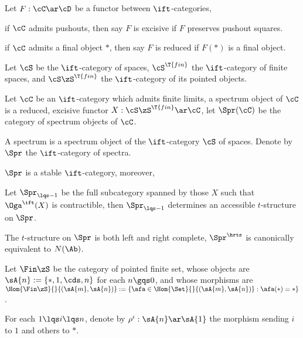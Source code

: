 \documentclass[article, a4paper, twoside]{universal}
\begin{document}
\begin{dfn}[1.4.2.1]
    Let $F:\cC\ar\cD$ be a functor between $\ift$-categories,
    \begin{enr}[label=(\arabic*)]
        \item if $\cC$ admits pushouts, then say $F$ is excisive if $F$ preserves pushout squares.
        \item if $\cC$ admits a final object $*$, then say $F$ is reduced if $F(*)$ is a final object.
    \end{enr}
\end{dfn}


\begin{dfn}[1.4.2.5, 1.4.2.8, 1.4.3.1]
    Let $\cS$ be the $\ift$-category of spaces, $\cS^{\T{fin}}$ the $\ift$-category of finite spaces, and $\cS\zS^{\T{fin}}$ the $\ift$-category of its pointed objects.

    Let $\cC$ be an $\ift$-category which admits finite limits, a spectrum object of $\cC$ is a reduced, excisive functor $X:\cS\zS^{\T{fin}}\ar\cC$, let $\Spr(\cC)$ be the category of spectrum objects of $\cC$.

    A spectrum is a spectrum object of the $\ift$-category $\cS$ of spaces. Denote by $\Spr$ the $\ift$-category of spectra.
\end{dfn}

\begin{thm}[1.4.3.6]
    $\Spr$ is a stable $\ift$-category, moreover,
    \begin{enr}[label=(\arabic*)]
        \item Let $\Spr_{\lqs-1}$ be the full subcategory spanned by those $X$ such that $\Oga^{\ift}(X)$ is contractible, then $\Spr_{\lqs-1}$ determines an accessible $t$-structure on $\Spr$.
        \item The $t$-structure on $\Spr$ is both left and right complete, $\Spr^{\hrts}$ is canonically equivalent to $N(\Ab)$.
    \end{enr}
\end{thm}


\begin{dfn}[2.0.0.2]
    Let $\Fin\zS$ be the category of pointed finite set, whose objects are $\sA{n}:=\{*,1,\cds,n\}$ for each $n\gqs0$, and whose morphisms are $\Hom{\Fin\zS}{}{(\sA{m},\sA{n})}:=\{\afa\in\Hom{\Set}{}{(\sA{m},\sA{n})}:\afa(*)=*\}$.

    For each $1\lqs i\lqs n$, denote by $\rho^{i}:\sA{n}\ar\sA{1}$ the morphism sending $i$ to $1$ and others to $*$.
\end{dfn}
\end{document}

